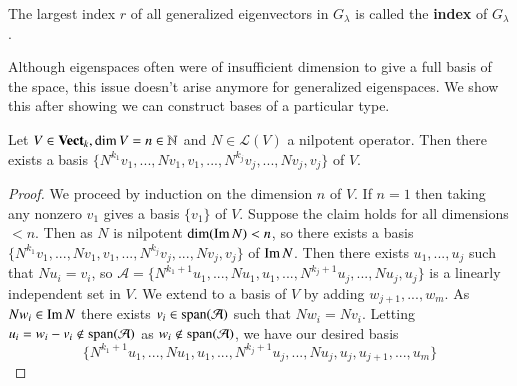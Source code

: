 \begin{definition}
    The largest index $r$ of all generalized eigenvectors in $G_{\lambda}$ is called the \textbf{index} of $G_{\lambda}$.  
\end{definition}

Although eigenspaces often were of insufficient dimension to give a full basis of the space, this issue doesn't arise anymore for generalized eigenspaces. We show this after showing we can construct bases of a particular type.

\begin{theorem}
    Let $V \in \normalfont\textbf{Vect}_{k},\dim V = n\in \mathbb N$ and $N \in \mathcal{L}(V)$ a nilpotent operator. Then there exists a basis $\{N^{k_1}v_1,...,Nv_1,v_1,...,N^{k_j}v_j,...,Nv_j,v_j\}$ of $V$.
\end{theorem}
\begin{proof}
    We proceed by induction on the dimension $n$ of $V$. If $n = 1$ then taking any nonzero $v_1$ gives a basis $\{v_1\}$ of $V$. Suppose the claim holds for all dimensions $< n$. Then as $N$ is nilpotent $\dim(\operatorname{Im} N) < n$, so there exists a basis $\{N^{k_1}v_1,...,Nv_1,v_1,...,N^{k_j}v_j,...,Nv_j,v_j\}$ of $\operatorname{Im} N$. Then there exists $u_1,...,u_j$ such that $Nu_i = v_i$, so $\mathcal{A} = \{N^{k_1+1}u_1,...,Nu_1,u_1,...,N^{k_j+1}u_j,...,Nu_j,u_j\}$ is a linearly independent set in $V$. We extend to a basis of $V$ by adding $w_{j+1},...,w_m$. As $Nw_i \in \operatorname{Im} N$ there exists $v_i \in \operatorname{span}(\mathcal{A})$ such that $Nw_i = Nv_i$. Letting $u_i = w_i-v_i \notin \operatorname{span}(\mathcal{A})$ as $w_i \notin \operatorname{span}(\mathcal{A})$, we have our desired basis \begin{equation*}
        \{N^{k_1+1}u_1,...,Nu_1,u_1,...,N^{k_j+1}u_j,...,Nu_j,u_j,u_{j+1},...,u_m\}
    \end{equation*}
\end{proof}


